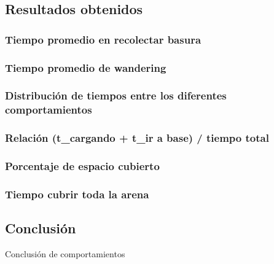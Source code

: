 \newpage
\subsection{Resultados obtenidos}
\label{results}

\subsubsection{Tiempo promedio en recolectar basura}

\subsubsection{Tiempo promedio de wandering}

\subsubsection{Distribuci\'on de tiempos entre los diferentes comportamientos}

\subsubsection{Relaci\'on (t\_cargando + t\_ir a base) / tiempo total}

\subsubsection{Porcentaje de espacio cubierto}

\subsubsection{Tiempo cubrir toda la arena}

\newpage
\subsection{Conclusi\'on}
\label{comp_conclusion}
Conclusi\'on de comportamientos

